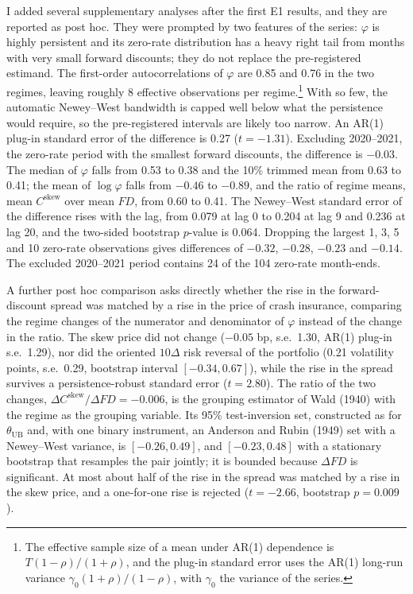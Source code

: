\documentclass[11pt]{article}
\theoremstyle{result}
\newcommand{\FD}{\mathit{FD}}
\newcommand{\Cskew}{C^{\mathrm{skew}}}
\newcommand{\thUB}{\theta_{\mathrm{UB}}}
\newcommand{\D}{\Delta}
\begin{document}
I added several supplementary analyses after the first E1 results, and they are reported as post hoc. They were prompted by two features of the series: $\varphi$ is highly persistent and its zero-rate distribution has a heavy right tail from months with very small forward discounts; they do not replace the pre-registered estimand. The first-order autocorrelations of $\varphi$ are 0.85 and 0.76 in the two regimes, leaving roughly 8 effective observations per regime.\footnote{The effective sample size of a mean under AR(1) dependence is $T(1-\rho)/(1+\rho)$, and the plug-in standard error uses the AR(1) long-run variance $\gamma_0(1+\rho)/(1-\rho)$, with $\gamma_0$ the variance of the series.} With so few, the automatic Newey--West bandwidth is capped well below what the persistence would require, so the pre-registered intervals are likely too narrow. An AR(1) plug-in standard error of the difference is 0.27 ($t=-1.31$). Excluding 2020--2021, the zero-rate period with the smallest forward discounts, the difference is $-0.03$. The median of $\varphi$ falls from 0.53 to 0.38 and the 10\% trimmed mean from 0.63 to 0.41; the mean of $\log\varphi$ falls from $-0.46$ to $-0.89$, and the ratio of regime means, mean $\Cskew$ over mean $\FD$, from 0.60 to 0.41. The Newey--West standard error of the difference rises with the lag, from 0.079 at lag 0 to 0.204 at lag 9 and 0.236 at lag 20, and the two-sided bootstrap $p$-value is 0.064. Dropping the largest 1, 3, 5 and 10 zero-rate observations gives differences of $-0.32$, $-0.28$, $-0.23$ and $-0.14$. The excluded 2020--2021 period contains 24 of the 104 zero-rate month-ends.

A further post hoc comparison asks directly whether the rise in the forward-discount spread was matched by a rise in the price of crash insurance, comparing the regime changes of the numerator and denominator of $\varphi$ instead of the change in the ratio. The skew price did not change ($-0.05$ bp, s.e.\ 1.30, AR(1) plug-in s.e.\ 1.29), nor did the oriented $10\D$ risk reversal of the portfolio (0.21 volatility points, s.e.\ 0.29, bootstrap interval $[-0.34,0.67]$), while the rise in the spread survives a persistence-robust standard error ($t=2.80$). The ratio of the two changes, $\Delta\Cskew/\Delta\FD=-0.006$, is the grouping estimator of Wald (1940) with the regime as the grouping variable. Its 95\% test-inversion set, constructed as for $\thUB$ and, with one binary instrument, an Anderson and Rubin (1949) set with a Newey--West variance, is $[-0.26,0.49]$, and $[-0.23,0.48]$ with a stationary bootstrap that resamples the pair jointly; it is bounded because $\Delta\FD$ is significant. At most about half of the rise in the spread was matched by a rise in the skew price, and a one-for-one rise is rejected ($t=-2.66$, bootstrap $p=0.009$).
\end{document}
